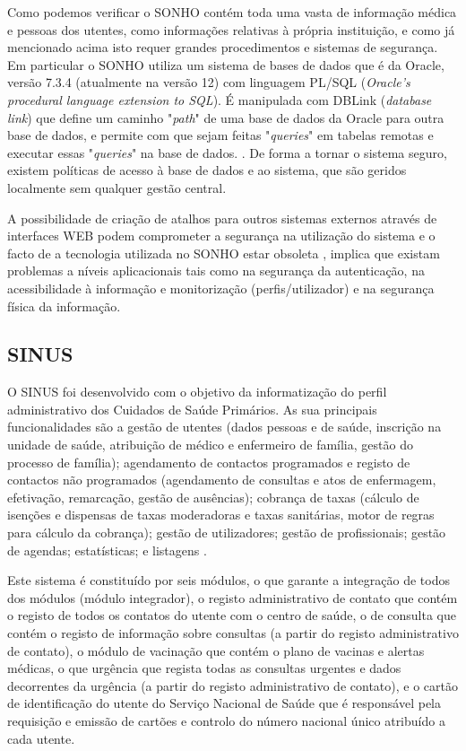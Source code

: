 \documentclass[conference]{IEEEtran}
\begin{document}
Como podemos verificar o SONHO contém toda uma vasta de informação médica e pessoas dos utentes, como informações relativas à própria instituição, e como já mencionado acima isto requer grandes procedimentos e sistemas de segurança. Em particular o SONHO utiliza um sistema de bases de dados que é da Oracle, versão 7.3.4 (atualmente na versão 12) com linguagem PL/SQL (\textit{Oracle’s procedural language extension to SQL}). É manipulada com DBLink (\textit{database link}) que define um caminho "\textit{path}" de uma base de dados da Oracle para outra base de dados, e permite com que sejam feitas "\textit{queries}" em tabelas remotas e executar essas "\textit{queries}" na base de dados. \cite{sonho}. De forma a tornar o sistema seguro, existem políticas de acesso à base de dados e ao sistema, que são geridos localmente sem qualquer gestão central. 

A possibilidade de criação de atalhos para outros sistemas externos através de interfaces WEB podem comprometer a segurança na utilização do sistema e o facto de a tecnologia utilizada no SONHO estar obsoleta \cite{sonho}, implica que existam problemas a níveis aplicacionais tais como na segurança da autenticação, na acessibilidade à informação e monitorização (perfis/utilizador) e na segurança física da informação.


\subsection{SINUS}

O SINUS foi desenvolvido com o objetivo da informatização do perfil administrativo dos Cuidados de Saúde Primários. As sua principais funcionalidades são a gestão de utentes (dados pessoas e de saúde, inscrição na unidade de saúde, atribuição de médico e enfermeiro de família, gestão do processo de família); agendamento de contactos programados e registo de contactos não programados (agendamento de consultas e atos de enfermagem, efetivação, remarcação, gestão de ausências); cobrança de taxas (cálculo de isenções e dispensas de taxas moderadoras e taxas sanitárias, motor de regras para cálculo da cobrança); gestão de utilizadores; gestão de profissionais; gestão de agendas; estatísticas; e listagens \cite{sinus}.

Este sistema é constituído por seis módulos, o que garante a integração de todos dos módulos (módulo integrador), o registo administrativo de contato que contém o registo de todos os contatos do utente com o centro de saúde, o de consulta que contém o registo de informação sobre consultas (a partir do registo administrativo de contato), o módulo de vacinação que contém o plano de vacinas e alertas médicas, o que urgência que regista todas as consultas urgentes e dados decorrentes da urgência (a partir do registo administrativo de contato), e o cartão de identificação do utente do Serviço Nacional de Saúde que é responsável  pela requisição e emissão de cartões e controlo do número nacional único atribuído a cada utente.
\end{document}
